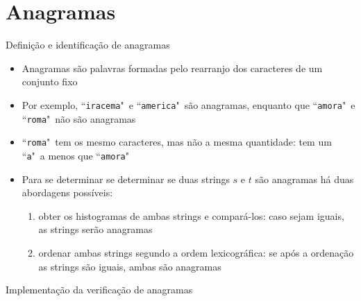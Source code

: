 \section{Anagramas}

\begin{frame}[fragile]{Definição e identificação de anagramas}

    \begin{itemize}
        \item Anagramas são palavras formadas pelo rearranjo dos caracteres de um conjunto fixo

        \item Por exemplo, ``\texttt{iracema}"\  e ``\texttt{america}"\  são anagramas, enquanto que ``\texttt{amora}"\  e ``\texttt{roma}"\  não são anagramas

        \item ``\texttt{roma}"\  tem os mesmo caracteres, mas não a mesma quantidade: tem um ``\texttt{a}"\ a menos que ``\texttt{amora}"

        \item Para se determinar se determinar se duas strings $s$ e $t$ são anagramas há duas abordagens possíveis:
            \begin{enumerate}
                \item obter os histogramas de ambas strings e compará-los: caso sejam iguais, as strings serão anagramas
                \item ordenar ambas strings segundo a ordem lexicográfica: se após a ordenação as strings são iguais, ambas são anagramas
            \end{enumerate}
    \end{itemize}

\end{frame}

\begin{frame}[fragile]{Implementação da verificação de anagramas}
\end{frame}

